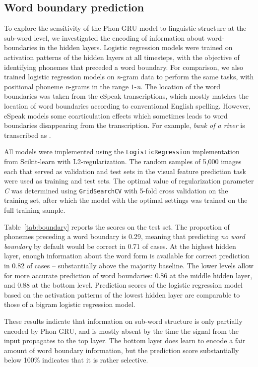 
\subsection{Word boundary prediction}
To explore the sensitivity of the {\sc Phon GRU} model to linguistic structure at the sub-word level, we investigated the encoding of information about word-boundaries in the hidden layers. Logistic regression models were trained on activation patterns of the hidden layers at all timesteps, with the objective of identifying phonemes that preceded a word boundary. For comparison, we also trained logistic regression models on \textit{n}-gram data to perform the same tasks, with positional phoneme \textit{n}-grams in the range $1$-\textit{n}. The location of the word boundaries was taken from the eSpeak transcriptions, which mostly matches the location of word boundaries according to conventional English spelling. However, eSpeak models some coarticulation effects which sometimes leads to word boundaries disappearing from the transcription. For example, {\it bank of a river} is transcribed as .

All models were implemented using the {\tt LogisticRegression} implementation from Scikit-learn \cite{scikit-learn} with L2-regularization. The random samples of 5,000 images each that served as validation and test sets in the visual feature prediction task were used as training and test sets. The optimal value of regularization parameter \textit{C} was determined using {\tt GridSearchCV} with 5-fold cross validation on the training set, after which the model with the optimal settings was trained on the full training sample.

Table~\ref{tab:boundary} reports the scores on the test set. The proportion of phonemes preceding a word boundary is 0.29, meaning that predicting {\it no word boundary} by default would be correct in 0.71 of cases. At the highest hidden layer, enough information about the word form is available for correct prediction in 0.82 of cases -- substantially above the majority baseline. The lower levels allow for more accurate prediction of word boundaries: 0.86 at the middle hidden layer, and 0.88 at the bottom level.
Prediction scores of the logistic regression model based on the activation patterns of the lowest hidden layer are comparable to those of a bigram logistic regression model.

These results indicate that information on sub-word structure is only partially encoded by {\sc Phon GRU}, and is mostly absent by the time the signal from the input propagates to the top layer. The bottom layer does learn to encode a fair amount of word boundary information, but the prediction score substantially below 100\% indicates that it is rather selective. 

